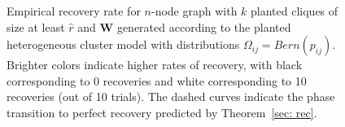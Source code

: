 \documentclass[twoside,11pt]{article}
\newcommand{\bs}{\boldsymbol}
\newcommand{\W}{\bs {W}}
\newcommand{\0}{\bs{0}}
\begin{document}
{\begin{figure}[t]
	\centering
		\caption{Empirical recovery rate for $n$-node graph with $k$ planted cliques of size at least $\hat r$ and \(\W\) generated
		according to the planted heterogeneous cluster model with distributions $\Omega_{ij} = Bern(p_{ij})$. Brighter colors indicate higher
		rates of recovery, with black corresponding to 0 recoveries and white corresponding to 10 recoveries (out of 10 trials).
		The dashed curves indicate the phase transition to perfect recovery predicted by Theorem~\ref{sec: rec}.}
	\label{fig: rec}
\end{figure}

}
\end{document}
